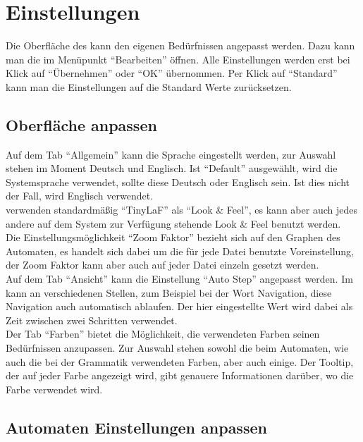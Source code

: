 \chapter{Einstellungen}

Die Oberfläche des \gtitools kann den eigenen Bedürfnissen angepasst werden.
Dazu kann man die  im Menüpunkt
"`Bearbeiten"' öffnen. Alle Einstellungen werden erst bei Klick auf 
"`Übernehmen"' oder "`OK"' übernommen. Per Klick auf "`Standard"' kann
man die Einstellungen auf die Standard Werte zurücksetzen.


\section{Oberfläche anpassen}

Auf dem Tab "`Allgemein"' kann die Sprache eingestellt werden, zur Auswahl
stehen im Moment Deutsch und Englisch. Ist "`Default"' ausgewählt, wird
die Systemsprache verwendet, sollte diese Deutsch oder Englisch sein. Ist dies
nicht der Fall, wird Englisch verwendet.\\
\gtitool verwenden standardmäßig "`TinyLaF"' als "`Look \& Feel"', es kann aber
auch jedes andere auf dem System zur Verfügung stehende Look \& Feel benutzt
werden.\\
Die Ein\-stell\-ungs\-möglich\-keit "`Zoom Faktor"' bezieht sich auf den Graphen 
des Automaten, es handelt sich dabei um die für jede Datei benutzte Voreinstellung,
der Zoom Faktor kann aber auch auf jeder Datei einzeln gesetzt werden.\\
Auf dem Tab "`Ansicht"' kann die Einstellung "`Auto Step"' angepasst werden. Im
\gtitool kann an verschiedenen Stellen, zum Beispiel bei der Wort Navigation, diese
Navigation auch automatisch ablaufen. Der hier eingestellte Wert wird dabei
als Zeit zwischen zwei Schritten verwendet.\\
Der Tab "`Farben"' bietet die Möglichkeit, die verwendeten Farben seinen
Be\-dürf\-nis\-sen anzupassen. Zur Auswahl stehen sowohl die beim Automaten, wie
auch die bei der Grammatik verwendeten Farben, aber auch einige. Der Tooltip,
der auf jeder Farbe angezeigt wird, gibt genauere Informationen darüber, wo
die Farbe verwendet wird.


\section{Automaten Einstellungen anpassen}

